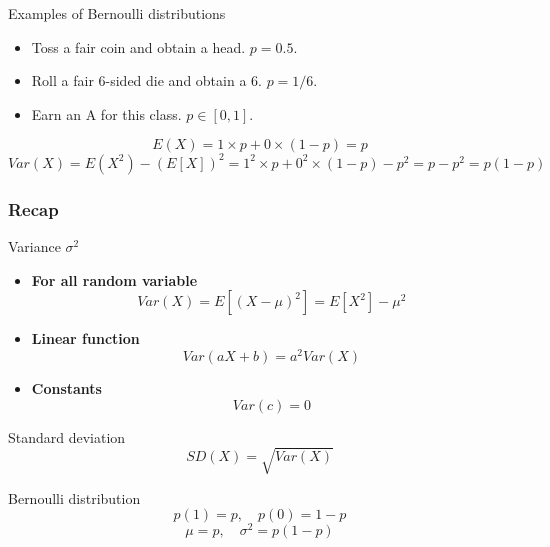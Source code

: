 \documentclass[slidestop,compress,mathserif]{beamer}
\begin{document}
\begin{frame}%
Examples of Bernoulli distributions
\begin{itemize}
\item Toss a fair coin and obtain a head. $p = 0.5$.
\item Roll a fair 6-sided die and obtain a 6. $p = 1/6$.
\item Earn an A for this class. $p \in [0, 1]$.
\end{itemize}

\pause
{}
\pause
\[E(X) = 1 \times p + 0 \times (1-p) = p\]
\[Var(X) = E(X^2) - (E[X])^2 = 1^2 \times p + 0^2 \times (1-p) - p^2= p - p^2 = p(1-p)\]



\end{frame}

\begin{frame}\frametitle{Recap}

Variance $\sigma^2$
\begin{itemize}
\item \textbf{For all random variable}
\[
Var(X) = E[(X - \mu)^2] = E[X^2] - \mu^2
\]
\vspace{2mm}
\item \textbf{Linear function}
\[Var(aX+b) = a^2 Var(X)\]
\item \textbf{Constants}
\[Var(c) = 0\]
\end{itemize}

Standard deviation
\[SD(X) = \sqrt{Var(X)}\]

Bernoulli distribution
\[p(1) = p, \quad p(0) = 1-p\]
\[\mu  = p, \quad \sigma^2 = p(1-p)\]

\end{frame}


\end{document}
